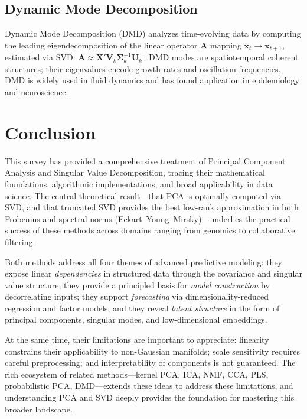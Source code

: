 \documentclass[conference]{IEEEtran}
\begin{document}
\subsection{Dynamic Mode Decomposition}

Dynamic Mode Decomposition (DMD) \cite{schmid2010} analyzes time-evolving data by computing the leading eigendecomposition of the linear operator $\mathbf{A}$ mapping $\mathbf{x}_t \to \mathbf{x}_{t+1}$, estimated via SVD: $\mathbf{A} \approx \mathbf{X}'\mathbf{V}_k\mathbf{\Sigma}_k^{-1}\mathbf{U}_k^\top$. DMD modes are spatiotemporal coherent structures; their eigenvalues encode growth rates and oscillation frequencies. DMD is widely used in fluid dynamics and has found application in epidemiology and neuroscience.

\section{Conclusion}
\label{sec:conclusion}

This survey has provided a comprehensive treatment of Principal Component Analysis and Singular Value Decomposition, tracing their mathematical foundations, algorithmic implementations, and broad applicability in data science. The central theoretical result---that PCA is optimally computed via SVD, and that truncated SVD provides the best low-rank approximation in both Frobenius and spectral norms (Eckart--Young--Mirsky)---underlies the practical success of these methods across domains ranging from genomics to collaborative filtering.

Both methods address all four themes of advanced predictive modeling: they expose linear \emph{dependencies} in structured data through the covariance and singular value structure; they provide a principled basis for \emph{model construction} by decorrelating inputs; they support \emph{forecasting} via dimensionality-reduced regression and factor models; and they reveal \emph{latent structure} in the form of principal components, singular modes, and low-dimensional embeddings.

At the same time, their limitations are important to appreciate: linearity constrains their applicability to non-Gaussian manifolds; scale sensitivity requires careful preprocessing; and interpretability of components is not guaranteed. The rich ecosystem of related methods---kernel PCA, ICA, NMF, CCA, PLS, probabilistic PCA, DMD---extends these ideas to address these limitations, and understanding PCA and SVD deeply provides the foundation for mastering this broader landscape.
\end{document}
